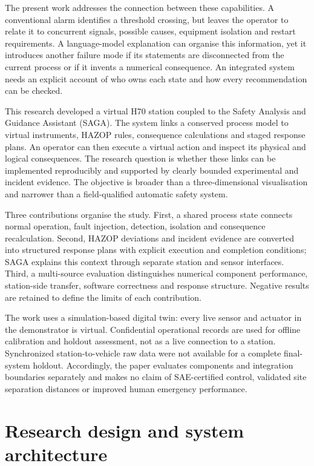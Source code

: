 \documentclass[12pt,a4paper]{article}
\begin{document}
The present work addresses the connection between these capabilities. A
conventional alarm identifies a threshold crossing, but leaves the operator to
relate it to concurrent signals, possible causes, equipment isolation and restart
requirements. A language-model explanation can organise this information, yet it
introduces another failure mode if its statements are disconnected from the
current process or if it invents a numerical consequence. An integrated system
needs an explicit account of who owns each state and how every recommendation
can be checked.

This research developed a virtual H70 station coupled to the Safety Analysis
and Guidance Assistant (SAGA). The system links a conserved process model to
virtual instruments, HAZOP rules, consequence calculations and staged response
plans. An operator can then execute a virtual action and inspect its physical
and logical consequences. The research question is whether these links can be
implemented reproducibly and supported by clearly bounded experimental and
incident evidence. The objective is broader than a three-dimensional
visualisation and narrower than a field-qualified automatic safety system.

Three contributions organise the study. First, a shared process state connects
normal operation, fault injection, detection, isolation and consequence
recalculation. Second, HAZOP deviations and incident evidence are converted into
structured response plans with explicit execution and completion conditions;
SAGA explains this context through separate station and sensor interfaces.
Third, a multi-source evaluation distinguishes numerical component performance,
station-side transfer, software correctness and response structure. Negative
results are retained to define the limits of each contribution.

The work uses a simulation-based digital twin: every live sensor and actuator
in the demonstrator is virtual. Confidential operational records are used for
offline calibration and holdout assessment, not as a live connection to a
station. Synchronized station-to-vehicle raw data were not available for a
complete final-system holdout. Accordingly, the paper evaluates components and
integration boundaries separately and makes no claim of SAE-certified control,
validated site separation distances or improved human emergency performance.

\section{Research design and system architecture}
\end{document}
